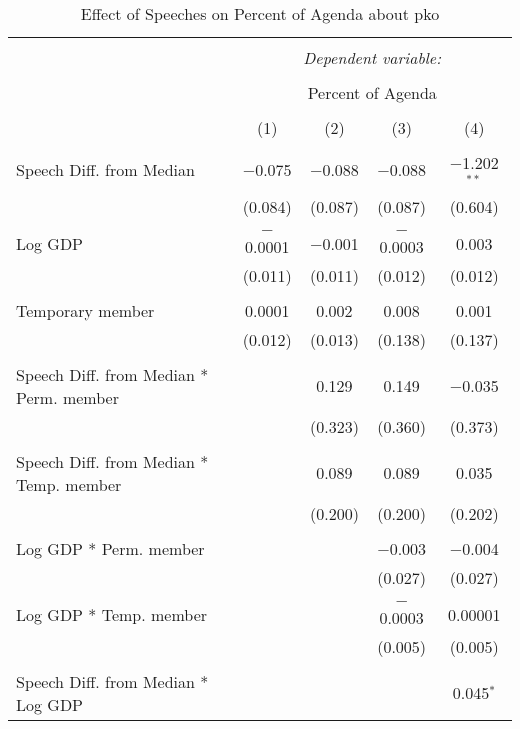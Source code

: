 
\begin{table}[!htbp] \centering 
  \caption{Effect of Speeches on Percent of Agenda about  pko} 
  \label{} 
\begin{tabular}{@{\extracolsep{5pt}}lcccc} 
\\[-1.8ex]\hline 
\hline \\[-1.8ex] 
 & \multicolumn{4}{c}{\textit{Dependent variable:}} \\ 
\cline{2-5} 
\\[-1.8ex] & \multicolumn{4}{c}{Percent of Agenda} \\ 
\\[-1.8ex] & (1) & (2) & (3) & (4)\\ 
\hline \\[-1.8ex] 
 Speech Diff. from Median & $-$0.075 & $-$0.088 & $-$0.088 & $-$1.202$^{**}$ \\ 
  & (0.084) & (0.087) & (0.087) & (0.604) \\ 
  & & & & \\ 
 Log GDP & $-$0.0001 & $-$0.001 & $-$0.0003 & 0.003 \\ 
  & (0.011) & (0.011) & (0.012) & (0.012) \\ 
  & & & & \\ 
 Temporary member & 0.0001 & 0.002 & 0.008 & 0.001 \\ 
  & (0.012) & (0.013) & (0.138) & (0.137) \\ 
  & & & & \\ 
 Speech Diff. from Median * Perm. member &  & 0.129 & 0.149 & $-$0.035 \\ 
  &  & (0.323) & (0.360) & (0.373) \\ 
  & & & & \\ 
 Speech Diff. from Median * Temp. member &  & 0.089 & 0.089 & 0.035 \\ 
  &  & (0.200) & (0.200) & (0.202) \\ 
  & & & & \\ 
 Log GDP * Perm. member &  &  & $-$0.003 & $-$0.004 \\ 
  &  &  & (0.027) & (0.027) \\ 
  & & & & \\ 
 Log GDP * Temp. member &  &  & $-$0.0003 & 0.00001 \\ 
  &  &  & (0.005) & (0.005) \\ 
  & & & & \\ 
 Speech Diff. from Median * Log GDP &  &  &  & 0.045$^{*}$ \\ 

\end{tabular}
\end{table}
